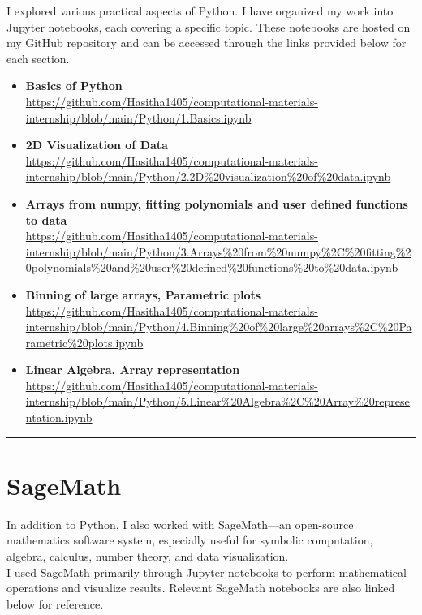 \documentclass[a4paper,12pt=]{article}
\begin{document}
I explored various practical aspects of Python. I have organized my work into Jupyter notebooks, each covering a specific topic. These notebooks are hosted on my GitHub repository and can be accessed through the links provided below for each section.

   \begin{itemize}
        \item \textbf{Basics of Python} 
        \\ \url{https://github.com/Hasitha1405/computational-materials-internship/blob/main/Python/1.Basics.ipynb}
    
        \item \textbf{2D Visualization of Data}
        \\ \url{https://github.com/Hasitha1405/computational-materials-internship/blob/main/Python/2.2D%20visualization%20of%20data.ipynb}

        \item \textbf{Arrays from numpy, fitting polynomials and user defined functions to data}
        \\
        \url{https://github.com/Hasitha1405/computational-materials-internship/blob/main/Python/3.Arrays%20from%20numpy%2C%20fitting%20polynomials%20and%20user%20defined%20functions%20to%20data.ipynb}

        \item \textbf{Binning of large arrays, Parametric plots}
        \\ \url{https://github.com/Hasitha1405/computational-materials-internship/blob/main/Python/4.Binning%20of%20large%20arrays%2C%20Parametric%20plots.ipynb}

        \item \textbf{Linear Algebra, Array representation}
        \\ \url{https://github.com/Hasitha1405/computational-materials-internship/blob/main/Python/5.Linear%20Algebra%2C%20Array%20representation.ipynb}


    \end{itemize} 

\rule{\linewidth}{0.1pt}


\section{SageMath}
In addition to Python, I also worked with SageMath—an open-source mathematics software system, especially useful for symbolic computation, algebra, calculus, number theory, and data visualization. \\I used SageMath primarily through Jupyter notebooks to perform mathematical operations and visualize results. Relevant SageMath notebooks are also linked below for reference.
\end{document}
